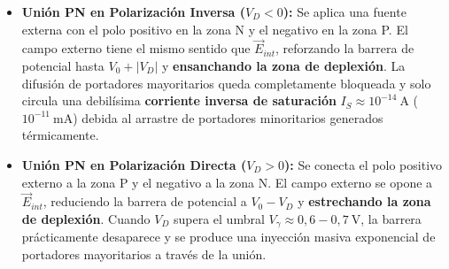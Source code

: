 \begin{center}
\end{center}

\begin{itemize}[leftmargin=*]
    \item \textbf{Unión PN en Polarización Inversa ($V_D < 0$):}
    Se aplica una fuente externa con el polo positivo en la zona N y el negativo en la zona P. El campo externo tiene el mismo sentido que $\vec{E}_{int}$, reforzando la barrera de potencial hasta $V_0 + |V_D|$ y \textbf{ensanchando la zona de deplexión}. La difusión de portadores mayoritarios queda completamente bloqueada y solo circula una debilísima \textbf{corriente inversa de saturación} $I_S \approx 10^{-14}\ \si{\ampere}$ ($10^{-11}\ \si{\milli\ampere}$) debida al arrastre de portadores minoritarios generados térmicamente.
    \item \textbf{Unión PN en Polarización Directa ($V_D > 0$):}
    Se conecta el polo positivo externo a la zona P y el negativo a la zona N. El campo externo se opone a $\vec{E}_{int}$, reduciendo la barrera de potencial a $V_0 - V_D$ y \textbf{estrechando la zona de deplexión}. Cuando $V_D$ supera el umbral $V_\gamma \approx 0{,}6 - 0{,}7\ \si{\volt}$, la barrera prácticamente desaparece y se produce una inyección masiva exponencial de portadores mayoritarios a través de la unión.
\end{itemize}

